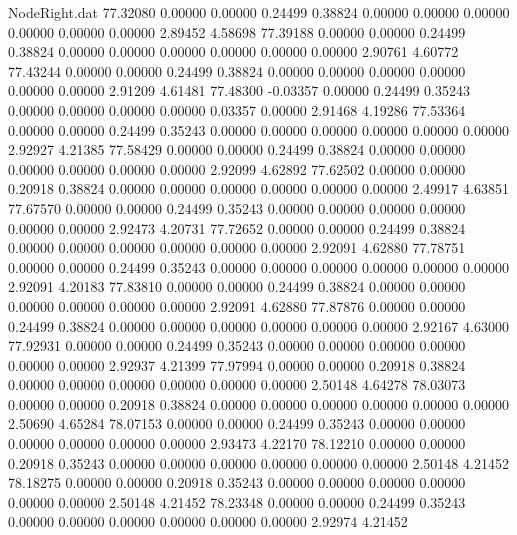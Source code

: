 \begin{filecontents}{NodeRight.dat}
  77.32080    0.00000    0.00000     0.24499    0.38824    0.00000    0.00000    0.00000    0.00000    0.00000    0.00000    2.89452    4.58698
  77.39188    0.00000    0.00000     0.24499    0.38824    0.00000    0.00000    0.00000    0.00000    0.00000    0.00000    2.90761    4.60772
  77.43244    0.00000    0.00000     0.24499    0.38824    0.00000    0.00000    0.00000    0.00000    0.00000    0.00000    2.91209    4.61481
  77.48300   -0.03357    0.00000     0.24499    0.35243    0.00000    0.00000    0.00000    0.00000    0.03357    0.00000    2.91468    4.19286
  77.53364    0.00000    0.00000     0.24499    0.35243    0.00000    0.00000    0.00000    0.00000    0.00000    0.00000    2.92927    4.21385
  77.58429    0.00000    0.00000     0.24499    0.38824    0.00000    0.00000    0.00000    0.00000    0.00000    0.00000    2.92099    4.62892
  77.62502    0.00000    0.00000     0.20918    0.38824    0.00000    0.00000    0.00000    0.00000    0.00000    0.00000    2.49917    4.63851
  77.67570    0.00000    0.00000     0.24499    0.35243    0.00000    0.00000    0.00000    0.00000    0.00000    0.00000    2.92473    4.20731
  77.72652    0.00000    0.00000     0.24499    0.38824    0.00000    0.00000    0.00000    0.00000    0.00000    0.00000    2.92091    4.62880
  77.78751    0.00000    0.00000     0.24499    0.35243    0.00000    0.00000    0.00000    0.00000    0.00000    0.00000    2.92091    4.20183
  77.83810    0.00000    0.00000     0.24499    0.38824    0.00000    0.00000    0.00000    0.00000    0.00000    0.00000    2.92091    4.62880
  77.87876    0.00000    0.00000     0.24499    0.38824    0.00000    0.00000    0.00000    0.00000    0.00000    0.00000    2.92167    4.63000
  77.92931    0.00000    0.00000     0.24499    0.35243    0.00000    0.00000    0.00000    0.00000    0.00000    0.00000    2.92937    4.21399
  77.97994    0.00000    0.00000     0.20918    0.38824    0.00000    0.00000    0.00000    0.00000    0.00000    0.00000    2.50148    4.64278
  78.03073    0.00000    0.00000     0.20918    0.38824    0.00000    0.00000    0.00000    0.00000    0.00000    0.00000    2.50690    4.65284
  78.07153    0.00000    0.00000     0.24499    0.35243    0.00000    0.00000    0.00000    0.00000    0.00000    0.00000    2.93473    4.22170
  78.12210    0.00000    0.00000     0.20918    0.35243    0.00000    0.00000    0.00000    0.00000    0.00000    0.00000    2.50148    4.21452
  78.18275    0.00000    0.00000     0.20918    0.35243    0.00000    0.00000    0.00000    0.00000    0.00000    0.00000    2.50148    4.21452
  78.23348    0.00000    0.00000     0.24499    0.35243    0.00000    0.00000    0.00000    0.00000    0.00000    0.00000    2.92974    4.21452

\end{filecontents}
